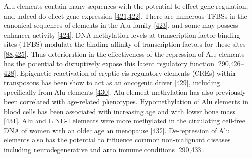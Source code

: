 \documentclass[
]{book}
\begin{document}
Alu elements contain many sequences with the potential to effect gene regulation, and indeed do effect gene expression {[}\protect\hyperlink{ref-Chen2017b}{421},\protect\hyperlink{ref-RobertoFerrari2019}{422}{]}.
There are numerous TFBSs in the canonical sequences of elements in the Alu family {[}\protect\hyperlink{ref-Polak2006}{423}{]}, and some may possess enhancer activity {[}\protect\hyperlink{ref-Su2014}{424}{]}.
DNA methylation levels at transcription factor binding sites (TFBS) modulate the binding affinity of transcription factors for these sites {[}\protect\hyperlink{ref-Yin2017}{88},\protect\hyperlink{ref-Blattler2014}{425}{]}.
Thus deterioration in the effectiveness of the repression of Alu elements has the potential to disruptively expose this latent regulatory function {[}\protect\hyperlink{ref-Chuong2017}{290},\protect\hyperlink{ref-Ward2013}{426}--\protect\hyperlink{ref-Zhang2019}{428}{]}.
Epigenetic reactivation of cryptic cis-regulatory elements (CREs) within transposons has been show to act as an oncogenic driver {[}\protect\hyperlink{ref-Jang2019}{429}{]}, including specifically from Alu elements {[}\protect\hyperlink{ref-Rajendiran2016}{430}{]}.
Alu element methylation has also previously been correlated with age-related phenotypes.
Hypomethylation of Alu elements in blood cells has been associated with increasing age and with lower bone mass {[}\protect\hyperlink{ref-Jintaridth2013}{431}{]}.
Alu and LINE-1 elements were more methylated in the circulating cell-free DNA of women with an older age an menopause {[}\protect\hyperlink{ref-Lu2018a}{432}{]}.
De-repression of Alu elements also has the potential to influence common non-malignant diseases including neurodegenerative and auto immune conditions {[}\protect\hyperlink{ref-Chuong2017}{290},\protect\hyperlink{ref-Payer2017}{433}{]}.
\end{document}
